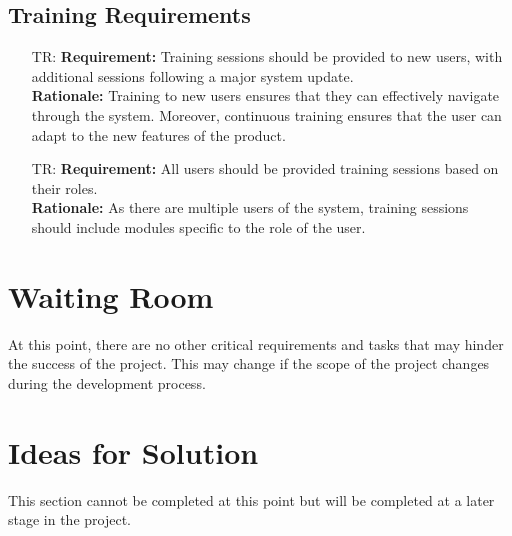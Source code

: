 \documentclass[12pt]{article}
\newcounter{trnum} %
\begin{document}
\subsection{Training Requirements}
\begin{itemize}

  \item [TR\refstepcounter{trnum}\thetrnum \label{TR_tr1}:] 
  \textbf{Requirement:} Training sessions should be provided to new users, with additional sessions following a major system update.\\
  \textbf{Rationale:} Training to new users ensures that they can effectively navigate through the system. Moreover, continuous training ensures that the user can adapt to the new features of the product. \\ 

  \item [TR\refstepcounter{trnum}\thetrnum \label{TR_tr2}:] 
  \textbf{Requirement:} All users should be provided training sessions based on their roles.\\
  \textbf{Rationale:} As there are multiple users of the system, training sessions should include modules specific to the role of the user.\\ 
\end{itemize}

\section{Waiting Room}
At this point, there are no other critical requirements and tasks that may hinder the success of the project. This may change if the scope of the project changes during the development process.

\section{Ideas for Solution}
This section cannot be completed at this point but will be completed at a later stage in the project.

\newpage
    
\end{document}
